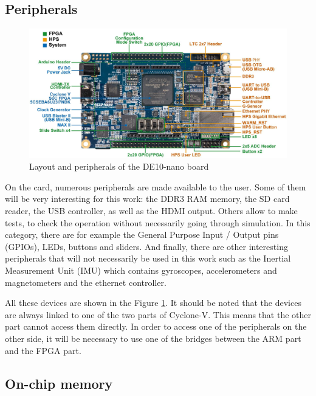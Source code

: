 \documentclass[12pt]{article}
\begin{document}
\subsection{Peripherals}

\begin{figure}[ht!]
  \center
  \includegraphics[width=\linewidth]{"res/board/layout_components.png"}
  \caption{Layout and peripherals of the DE10-nano board}
  \label{fig:de10nano_peripherals}
\end{figure}

On the card, numerous peripherals are made available to the user. Some of them will be very interesting for this work: the DDR3 RAM memory, the SD card reader, the USB controller, as well as the HDMI output. Others allow to make tests, to check the operation without necessarily going through simulation. In this category, there are for example the General Purpose Input / Output pins (GPIOs), LEDs, buttons and sliders. And finally, there are other interesting peripherals that will not necessarily be used in this work such as the Inertial Measurement Unit (IMU) which contains gyroscopes, accelerometers and magnetometers and the ethernet controller.

\vspace{12pt}
All these devices are shown in the Figure \ref{fig:de10nano_peripherals}. It should be noted that the devices are always linked to one of the two parts of Cyclone-V. This means that the other part cannot access them directly. In order to access one of the peripherals on the other side, it will be necessary to use one of the bridges between the ARM part and the FPGA
part.

\subsection{On-chip memory}
\label{sec:ocm}
\end{document}
